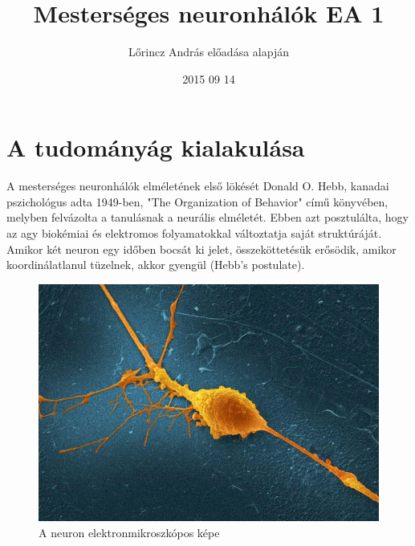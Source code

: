 \documentclass{article}
\title{Mesterséges neuronhálók EA 1}
\author{Lőrincz András előadása alapján}
\date{2015 09 14}
\begin{document}
\maketitle

\section{A tudományág kialakulása}
A mesterséges neuronhálók elméletének első lökését Donald O. Hebb, kanadai pszichológus adta 1949-ben, "The Organization of Behavior" című könyvében, melyben felvázolta a tanulásnak a neurális elméletét. Ebben azt posztulálta, hogy az agy biokémiai és elektromos folyamatokkal változtatja saját struktúráját. Amikor két neuron egy időben bocsát ki jelet, összeköttetésük erősödik, amikor koordinálatlanul tüzelnek, akkor gyengül (Hebb's postulate). \newline

\begin{figure}[h!]
\centering
\includegraphics[width=\textwidth,height=\textheight,keepaspectratio]{realneuron.jpg}


\caption{A neuron elektronmikroszkópos képe}
\label{fig:realneuron}
\end{figure}
\end{document}
